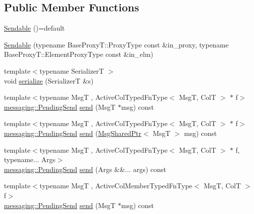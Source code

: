 \subsection*{Public Member Functions}
\begin{DoxyCompactItemize}
\item 
\hyperlink{structvt_1_1vrt_1_1collection_1_1_sendable_a26f7014b7bb14f0e4b758b5b076834f1}{Sendable} ()=default
\item 
\hyperlink{structvt_1_1vrt_1_1collection_1_1_sendable_aa4b3473480b076117715d1d21b53919b}{Sendable} (typename Base\+Proxy\+T\+::\+Proxy\+Type const \&in\+\_\+proxy, typename Base\+Proxy\+T\+::\+Element\+Proxy\+Type const \&in\+\_\+elm)
\item 
{\footnotesize template$<$typename SerializerT $>$ }\\void \hyperlink{structvt_1_1vrt_1_1collection_1_1_sendable_ae8e7cff31e30aa7cda6b958c1a81ddc3}{serialize} (SerializerT \&s)
\item 
{\footnotesize template$<$typename MsgT , Active\+Col\+Typed\+Fn\+Type$<$ Msg\+T, Col\+T $>$ $\ast$ f$>$ }\\\hyperlink{structvt_1_1messaging_1_1_pending_send}{messaging\+::\+Pending\+Send} \hyperlink{structvt_1_1vrt_1_1collection_1_1_sendable_a321d85ceafaf6525875fb7468a80ac6d}{send} (MsgT $\ast$msg) const
\item 
{\footnotesize template$<$typename MsgT , Active\+Col\+Typed\+Fn\+Type$<$ Msg\+T, Col\+T $>$ $\ast$ f$>$ }\\\hyperlink{structvt_1_1messaging_1_1_pending_send}{messaging\+::\+Pending\+Send} \hyperlink{structvt_1_1vrt_1_1collection_1_1_sendable_aa8c102820895d01422c14e8c0993fc90}{send} (\hyperlink{namespacevt_ab2b3d506ec8e8d1540aede826d84a239}{Msg\+Shared\+Ptr}$<$ MsgT $>$ msg) const
\item 
{\footnotesize template$<$typename MsgT , Active\+Col\+Typed\+Fn\+Type$<$ Msg\+T, Col\+T $>$ $\ast$ f, typename... Args$>$ }\\\hyperlink{structvt_1_1messaging_1_1_pending_send}{messaging\+::\+Pending\+Send} \hyperlink{structvt_1_1vrt_1_1collection_1_1_sendable_a65e5494a18b398b52f12c056cff1dc16}{send} (Args \&\&... args) const
\item 
{\footnotesize template$<$typename MsgT , Active\+Col\+Member\+Typed\+Fn\+Type$<$ Msg\+T, Col\+T $>$ f$>$ }\\\hyperlink{structvt_1_1messaging_1_1_pending_send}{messaging\+::\+Pending\+Send} \hyperlink{structvt_1_1vrt_1_1collection_1_1_sendable_a321d85ceafaf6525875fb7468a80ac6d}{send} (MsgT $\ast$msg) const

\end{DoxyCompactItemize}
